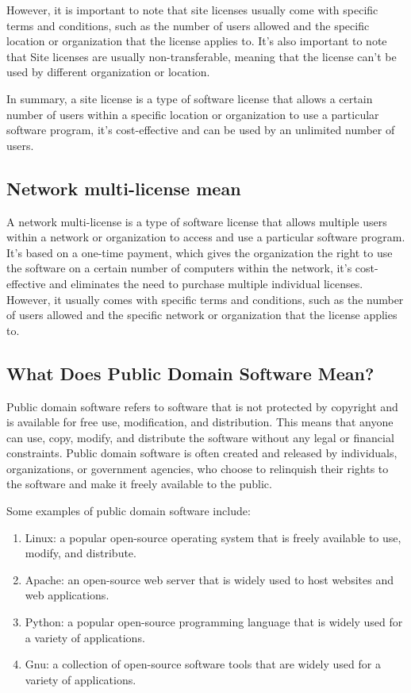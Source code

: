 \documentclass[twocolumn, 12pt, a4paper]{article}
\begin{document}
However, it is important to note that site licenses usually come with specific
terms and conditions, such as the number of users allowed and the specific
location or organization that the license applies to. It's also important to
note that Site licenses are usually non-transferable, meaning that the license
can't be used by different organization or location.

In summary, a site license is a type of software license that allows a certain 
number of users within a specific location or organization to use a particular 
software program, it's cost-effective and can be used by an unlimited number of
users.

\subsection{Network multi-license mean}
A network multi-license is a type of software license that allows multiple
users within a network or organization to access and use a particular software
program. It's based on a one-time payment, which gives the organization the
right to use the software on a certain number of computers within the network,
it's cost-effective and eliminates the need to purchase multiple individual
licenses. However, it usually comes with specific terms and conditions, such as
the number of users allowed and the specific network or organization that the
license applies to.

\subsection{What Does Public Domain Software Mean?}
Public domain software refers to software that is not protected by copyright
and is available for free use, modification, and distribution. This means that
anyone can use, copy, modify, and distribute the software without any legal or
financial constraints. Public domain software is often created and released by
individuals, organizations, or government agencies, who choose to relinquish
their rights to the software and make it freely available to the public.

Some examples of public domain software include:

\begin{enumerate}
  \item Linux: a popular open-source operating system that is freely available
    to use, modify, and distribute. 
  \item Apache: an open-source web server that is widely used to host websites
    and web applications. 
  \item Python: a popular open-source programming language that is widely used
    for a variety of applications. 
  \item Gnu: a collection of open-source software tools that are widely used
    for a variety of applications. 
\end{enumerate}
\end{document}
